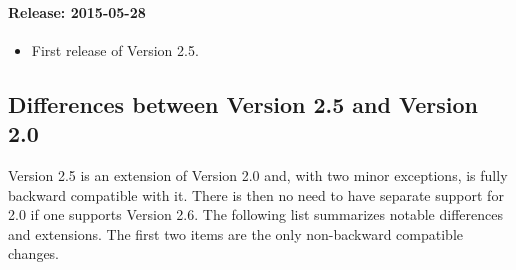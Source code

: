 \paragraph{Release: 2015-05-28}
\begin{itemize}
\item 
First release of Version 2.5.
\end{itemize}

\subsection{Differences between Version 2.5 and Version 2.0}

Version 2.5 is an extension of Version 2.0 and, with two minor exceptions,
is fully backward compatible with it.
There is then no need to have separate support for 2.0 
if one supports Version 2.6.
The following list summarizes notable differences and extensions.
The first two items are the only non-backward compatible changes.


